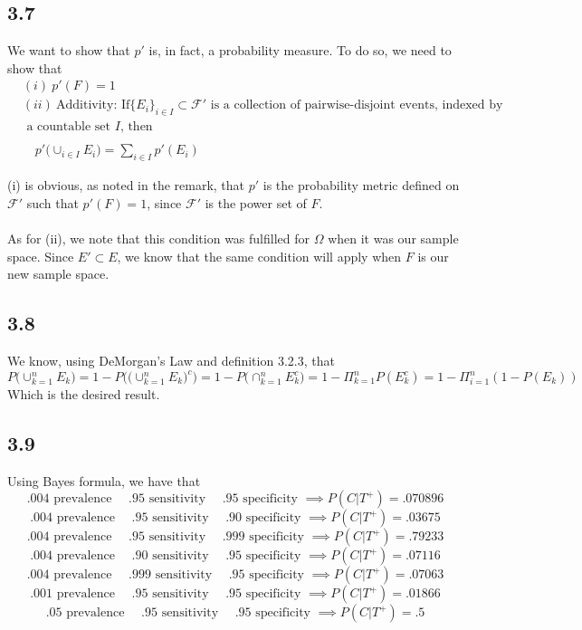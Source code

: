 \documentclass[letterpaper,12pt]{article}
\theoremstyle{definition}
\begin{document}
\title{}
\author{Chris Rytting}
\maketitle

\subsection*{3.7}
We want to show that $p'$ is, in fact, a probability measure. To do so, we need to show that 
\begin{align*}
    &(i) ~ p'(F) = 1\\
    &(ii) ~ \text{Additivity: If} \{E_i\}_{i \in I} \subset \mathscr{F}' \text{ is a collection of pairwise-disjoint events, indexed by}\\&\text{ a countable set $I$, then} \\\\
    & \quad p' \Big( \cup_{i \in I} E_i  \Big) = \sum_{i \in I} p'(E_i)
\end{align*}

(i) is obvious, as noted in the remark, that $p'$ is the probability metric defined on $\mathscr{F}'$ such that $p'(F) =1$, since $\mathscr{F}'$ is the power set of $F$.
\\\\
As for (ii), we note that this condition was fulfilled for $\Omega$ when it was our sample space. Since $E' \subset E$, we know that the same condition will apply when $F$ is our new sample space. 

\subsection*{3.8}
We know, using DeMorgan's Law and definition 3.2.3, that
\[P \Big( \cup^{n}_{k=1} E_k \Big) = 1 - P \Big(  \Big( \cup^{n}_{k=1} E_k \Big)^c \Big)  = 1 - P  \Big( \cap^{n}_{k=1} E_k^c \Big)  = 1 - \Pi_{k=1}^nP(E_k^c) = 1 - \Pi_{i=1}^n (1-P(E_k))\]
Which is the desired result.

\subsection*{3.9}
Using Bayes formula, we have that
\[ .004 \text{ prevalence }\quad .95 \text{ sensitivity }\quad .95 \text{ specificity } \implies P(C|T^+) = .070896 \]
\[ .004 \text{ prevalence }\quad .95 \text{ sensitivity }\quad .90 \text{ specificity } \implies P(C|T^+) = .03675 \]
\[ .004 \text{ prevalence }\quad .95 \text{ sensitivity }\quad .999 \text{ specificity } \implies P(C|T^+) = .79233 \]
\[ .004 \text{ prevalence }\quad .90 \text{ sensitivity }\quad .95 \text{ specificity } \implies P(C|T^+) = .07116 \]
\[ .004 \text{ prevalence }\quad .999 \text{ sensitivity }\quad .95 \text{ specificity } \implies P(C|T^+) = .07063 \]
\[ .001 \text{ prevalence }\quad .95 \text{ sensitivity }\quad .95 \text{ specificity } \implies P(C|T^+) = .01866\]
\[ .05 \text{ prevalence }\quad .95 \text{ sensitivity }\quad .95 \text{ specificity } \implies P(C|T^+) = .5 \]
\end{document}

